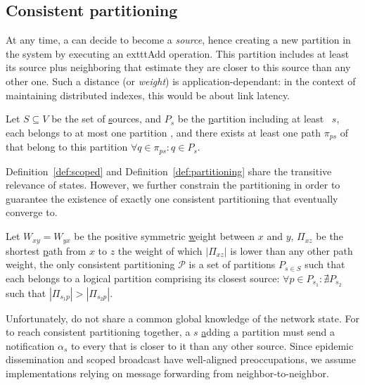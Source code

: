 

\subsection{Consistent partitioning}
\label{subsec:consistent}

At any time, a \process can decide to become a \emph{source}, hence
creating a new partition in the system by executing an exttt{Add}
operation. This partition includes at least its source plus
neighboring \processes that estimate they are closer to this source
than any other one. Such a distance (or \emph{weight}) is
application-dependant: in the context of maintaining distributed
indexes, this would be about link latency.

\begin{definition}
  Let $S \subseteq V$ be the set of \underline{s}ources, and $P_s$ be
  the \underline{p}artition including at least \Process~$s$, each
  \process belongs to at most one partition , and there exists at least one path $\pi_{ps}$ of
  \processes that belong to this partition $\forall q \in \pi_{ps}: q
  \in P_s$.
\end{definition}

Definition~\ref{def:scoped} and Definition~\ref{def:partitioning}
share the transitive relevance of \process states. However, we further
constrain the partitioning in order to guarantee the existence of
exactly one consistent partitioning that \processes eventually converge
to.

\begin{definition}
  Let $W_{xy} = W_{yx}$ be the positive symmetric \underline{w}eight
  between $x$ and $y$, $\Pi_{xz}$ be the shortest \underline{p}ath
  from $x$ to $z$ the weight of which $|\Pi_{xz}|$ is lower than any
  other path weight, the only consistent partitioning $\mathcal{P}$ is
  a set of partitions $P_{s\in S}$ such that each \process belongs to
  a logical partition comprising its closest source: $\forall p \in
  P_{s_1}: \nexists P_{s_2}$ such that $|\Pi_{s_1p}| > |\Pi_{s_2p}|$.
\end{definition}

Unfortunately, \processes do not share a common global knowledge of
the network state. For \processes to reach consistent partitioning
together, a \Process $s$ \underline{a}dding a partition must send a
notification $\alpha_s$ to every \process that is closer to it than
any other source. Since epidemic dissemination and scoped broadcast
have well-aligned preoccupations, we assume implementations relying on
message forwarding from neighbor-to-neighbor.

